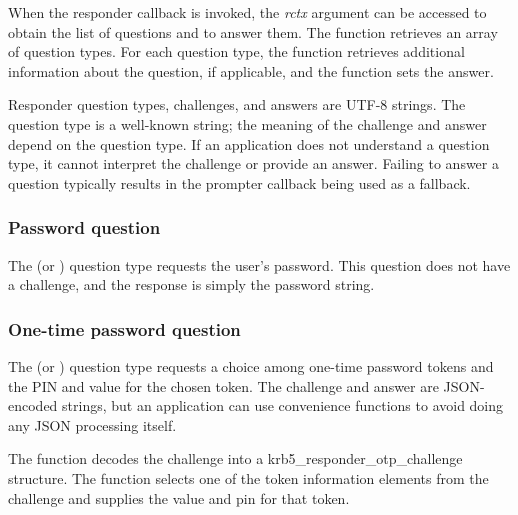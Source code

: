 \documentclass[letterpaper,10pt,english]{sphinxmanual}
\begin{document}
When the responder callback is invoked, the \emph{rctx} argument can be
accessed to obtain the list of questions and to answer them.  The
{\hyperref[appdev/refs/api/krb5_responder_list_questions:krb5_responder_list_questions]{}} function retrieves an array of
question types.  For each question type, the
{\hyperref[appdev/refs/api/krb5_responder_get_challenge:krb5_responder_get_challenge]{}} function retrieves additional
information about the question, if applicable, and the
{\hyperref[appdev/refs/api/krb5_responder_set_answer:krb5_responder_set_answer]{}} function sets the answer.

Responder question types, challenges, and answers are UTF-8 strings.
The question type is a well-known string; the meaning of the challenge
and answer depend on the question type.  If an application does not
understand a question type, it cannot interpret the challenge or
provide an answer.  Failing to answer a question typically results in
the prompter callback being used as a fallback.


\subsubsection{Password question}
\label{appdev/init_creds:password-question}
The  (or )
question type requests the user's password.  This question does not
have a challenge, and the response is simply the password string.


\subsubsection{One-time password question}
\label{appdev/init_creds:one-time-password-question}
The  (or ) question
type requests a choice among one-time password tokens and the PIN and
value for the chosen token.  The challenge and answer are JSON-encoded
strings, but an application can use convenience functions to avoid
doing any JSON processing itself.

The {\hyperref[appdev/refs/api/krb5_responder_otp_get_challenge:krb5_responder_otp_get_challenge]{}} function decodes the
challenge into a krb5\_responder\_otp\_challenge structure.  The
{\hyperref[appdev/refs/api/krb5_responder_otp_set_answer:krb5_responder_otp_set_answer]{}} function selects one of the
token information elements from the challenge and supplies the value
and pin for that token.
\end{document}
